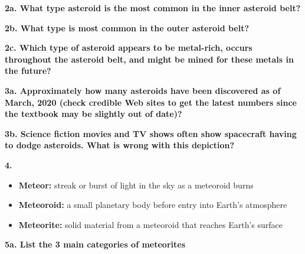 \documentclass{report}
\begin{document}
    \bigbreak \noindent 
    \textbf{2a. What type asteroid is the most common in the inner asteroid belt? }
    \bigbreak \noindent 

    \bigbreak \noindent 
    \textbf{2b. What type is most common in the outer asteroid belt?}
    \bigbreak \noindent 

    \bigbreak \noindent 
    \textbf{2c.  Which type of asteroid appears to be metal-rich, occurs throughout the asteroid belt, and
    might be mined for these metals in the future?}
    \bigbreak \noindent 

    \pagebreak \bigbreak \noindent 
    \textbf{3a. Approximately how many asteroids have been discovered as of March, 2020 (check
    credible Web sites to get the latest numbers since the textbook may be slightly out of date)?}
    \bigbreak \noindent 

    \bigbreak \noindent 
    \textbf{3b. Science fiction movies and TV shows often show spacecraft having to dodge asteroids.
    What is wrong with this depiction?}
    \bigbreak \noindent 

    \bigbreak \noindent 
    \textbf{4.}
    \begin{itemize}
        \item \textbf{Meteor:}   streak or burst of light in the sky as a meteoroid burns
        \item \textbf{Meteoroid:} a small planetary body before entry into Earth’s atmosphere
        \item \textbf{Meteorite:} solid material from a meteoroid that reaches Earth’s surface 
    \end{itemize}

    \bigbreak \noindent 
    \textbf{5a. List the 3 main categories of meteorites}
    \bigbreak \noindent 
\end{document}
